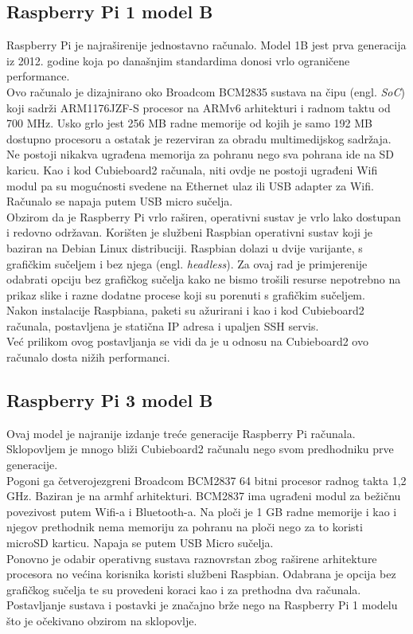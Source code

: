 \documentclass[times, utf8, zavrsni]{fer}
\begin{document}
\subsection{Raspberry Pi 1 model B}
Raspberry Pi je najraširenije jednostavno računalo. Model 1B jest prva generacija iz 2012. godine koja po današnjim standardima
donosi vrlo ograničene performance. \\
Ovo računalo je dizajnirano oko Broadcom BCM2835 sustava na čipu (engl. \emph{SoC}) koji sadrži ARM1176JZF-S procesor na ARMv6
arhitekturi i radnom taktu od 700 MHz. Usko grlo jest 256 MB radne memorije od kojih je samo 192 MB dostupno procesoru a ostatak je
rezerviran za obradu multimedijskog sadržaja. Ne postoji nikakva ugrađena memorija za pohranu nego sva pohrana ide na SD karicu.
Kao i kod Cubieboard2 računala, niti ovdje ne postoji ugrađeni Wifi modul pa su mogućnosti svedene na Ethernet ulaz ili USB
adapter za Wifi. Računalo se napaja putem USB micro sučelja.\\
Obzirom da je Raspberry Pi vrlo raširen, operativni sustav je vrlo lako dostupan i redovno održavan. Korišten je službeni
Raspbian operativni sustav koji je baziran na Debian Linux distribuciji. Raspbian dolazi u dvije varijante, s grafičkim sučeljem
i bez njega (engl. \emph{headless}). Za ovaj rad je primjerenije odabrati opciju bez grafičkog sučelja kako ne bismo trošili
resurse nepotrebno na prikaz slike i razne dodatne procese koji su porenuti s grafičkim sučeljem. \\
Nakon instalacije Raspbiana, paketi su ažurirani i kao i kod Cubieboard2 računala, postavljena je statična IP adresa i upaljen SSH
servis. \\
Već prilikom ovog postavljanja se vidi da je u odnosu na Cubieboard2 ovo računalo dosta nižih performanci.
\subsection{Raspberry Pi 3 model B}
Ovaj model je najranije izdanje treće generacije Raspberry Pi računala. Sklopovljem je mnogo bliži Cubieboard2 računalu nego
svom predhodniku prve generacije. \\
Pogoni ga četverojezgreni Broadcom BCM2837 64 bitni procesor radnog takta 1,2 GHz. Baziran je na armhf arhitekturi.
BCM2837 ima ugrađeni modul za bežičnu povezivost putem Wifi-a i Bluetooth-a. Na ploči je 1 GB radne memorije i kao i njegov prethodnik
nema memoriju za pohranu na ploči nego za to koristi microSD karticu. Napaja se putem USB Micro sučelja. \\
Ponovno je odabir operativng sustava raznovrstan zbog raširene arhitekture procesora no većina korisnika koristi službeni 
Raspbian. Odabrana je opcija bez grafičkog sučelja te su provedeni koraci kao i za prethodna dva računala. \\
Postavljanje sustava i postavki je značajno brže nego na Raspberry Pi 1 modelu što je očekivano obzirom na sklopovlje.
\end{document}
